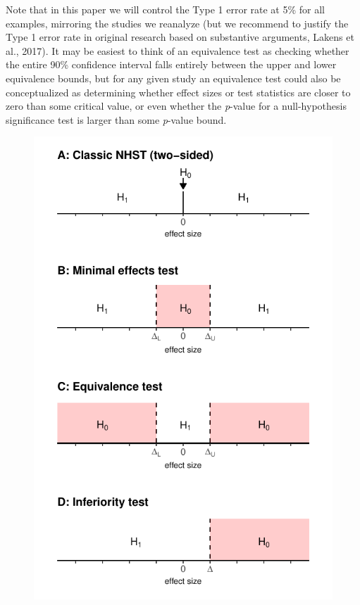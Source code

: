 \documentclass[english,floatsintext,man]{apa6}
\theoremstyle{definition}
\theoremstyle{definition}
\theoremstyle{definition}
\theoremstyle{remark}
\begin{document}
Note that in this paper we will control the Type 1 error rate at 5\% for
all examples, mirroring the studies we reanalyze (but we recommend to
justify the Type 1 error rate in original research based on substantive
arguments, Lakens et al., 2017). It may be easiest to think of an
equivalence test as checking whether the entire 90\% confidence interval
falls entirely between the upper and lower equivalence bounds, but for
any given study an equivalence test could also be conceptualized as
determining whether effect sizes or test statistics are closer to zero
than some critical value, or even whether the \emph{p}-value for a
null-hypothesis significance test is larger than some \emph{p}-value
bound.

\begin{figure}
\centering
\includegraphics{Figure_1.pdf}

\end{figure}
\end{document}
